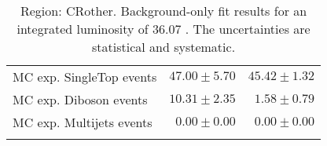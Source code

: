 \begin{table}
\begin{center}
{\begin{tabular*}{\textwidth}{@{\extracolsep{\fill}}lrr}
        MC exp. SingleTop events         & $47.00 \pm 5.70$          & $45.42 \pm 1.32$              \\
        MC exp. Diboson events         & $10.31 \pm 2.35$          & $1.58 \pm 0.79$              \\
        MC exp. Multijets events         & $0.00 \pm 0.00$          & $0.00 \pm 0.00$              \\
\noalign{\smallskip}\hline\noalign{\smallskip}
\end{tabular*}
}
\end{center}
\caption{Region: CRother. Background-only fit results for an integrated luminosity of 36.07 \ifb. The uncertainties are statistical and systematic.
}
\label{table.bkgonly.CRother}
\end{table}
%